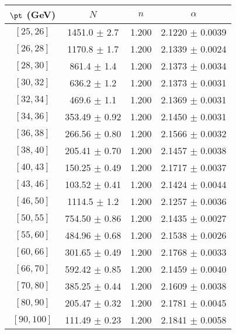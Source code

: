 \begin{tabular}{c||c|c|c}
$\pt$ (GeV) & $N$ & $n$ & $\alpha$ \\
\hline
$[25, 26]$ & 1451.0 $\pm$ 2.7 & 1.200 & 2.1220 $\pm$ 0.0039\\
$[26, 28]$ & 1170.8 $\pm$ 1.7 & 1.200 & 2.1339 $\pm$ 0.0024\\
$[28, 30]$ & 861.4 $\pm$ 1.4 & 1.200 & 2.1373 $\pm$ 0.0034\\
$[30, 32]$ & 636.2 $\pm$ 1.2 & 1.200 & 2.1373 $\pm$ 0.0031\\
$[32, 34]$ & 469.6 $\pm$ 1.1 & 1.200 & 2.1369 $\pm$ 0.0031\\
$[34, 36]$ & 353.49 $\pm$ 0.92 & 1.200 & 2.1450 $\pm$ 0.0031\\
$[36, 38]$ & 266.56 $\pm$ 0.80 & 1.200 & 2.1566 $\pm$ 0.0032\\
$[38, 40]$ & 205.41 $\pm$ 0.70 & 1.200 & 2.1457 $\pm$ 0.0038\\
$[40, 43]$ & 150.25 $\pm$ 0.49 & 1.200 & 2.1717 $\pm$ 0.0037\\
$[43, 46]$ & 103.52 $\pm$ 0.41 & 1.200 & 2.1424 $\pm$ 0.0044\\
$[46, 50]$ & 1114.5 $\pm$ 1.2 & 1.200 & 2.1257 $\pm$ 0.0036\\
$[50, 55]$ & 754.50 $\pm$ 0.86 & 1.200 & 2.1435 $\pm$ 0.0027\\
$[55, 60]$ & 484.96 $\pm$ 0.68 & 1.200 & 2.1538 $\pm$ 0.0026\\
$[60, 66]$ & 301.65 $\pm$ 0.49 & 1.200 & 2.1768 $\pm$ 0.0033\\
$[66, 70]$ & 592.42 $\pm$ 0.85 & 1.200 & 2.1459 $\pm$ 0.0040\\
$[70, 80]$ & 385.25 $\pm$ 0.44 & 1.200 & 2.1609 $\pm$ 0.0038\\
$[80, 90]$ & 205.47 $\pm$ 0.32 & 1.200 & 2.1781 $\pm$ 0.0045\\
$[90, 100]$ & 111.49 $\pm$ 0.23 & 1.200 & 2.1841 $\pm$ 0.0058\\
\end{tabular}
